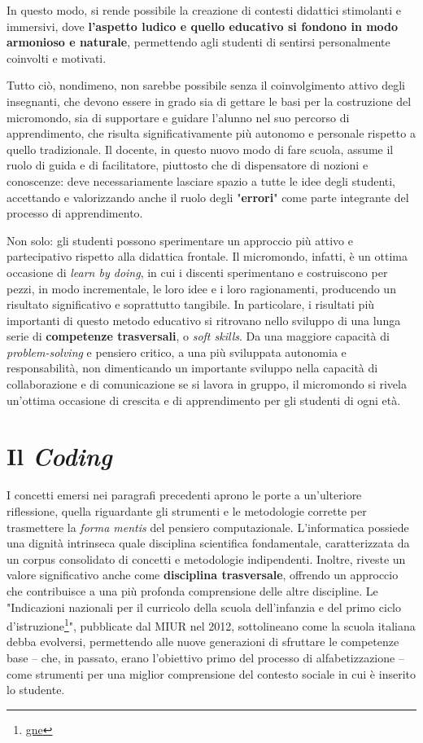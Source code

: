 In questo modo, si rende possibile la creazione di contesti didattici stimolanti e immersivi, dove \textbf{l'aspetto ludico e quello educativo si fondono in modo armonioso e naturale}, permettendo agli studenti di
sentirsi personalmente coinvolti e motivati.

Tutto ciò, nondimeno, non sarebbe possibile senza il coinvolgimento attivo degli insegnanti, che devono essere in grado sia di gettare le basi per la costruzione del micromondo, sia di 
supportare e guidare l'alunno nel suo percorso di apprendimento, che risulta significativamente più autonomo e personale rispetto a quello tradizionale. Il docente, in questo nuovo modo di fare scuola, 
assume il ruolo di guida e di facilitatore, piuttosto che di dispensatore di nozioni e conoscenze: deve necessariamente lasciare spazio a tutte le idee degli studenti, accettando e valorizzando anche 
il ruolo degli "\textbf{errori}" come parte integrante del processo di apprendimento. 

Non solo: gli studenti possono sperimentare un approccio più attivo e partecipativo rispetto alla didattica frontale.
Il micromondo, infatti, è un ottima occasione di \textit{learn by doing}, in cui i discenti sperimentano e costruiscono per pezzi, in modo
incrementale, le loro idee e i loro ragionamenti, producendo un risultato significativo e soprattutto tangibile. 
In particolare, i risultati più importanti di questo metodo educativo si ritrovano nello sviluppo di una lunga serie di \textbf{competenze trasversali}, o \textit{soft skills}. Da una maggiore capacità di   \textit{problem-solving} e
pensiero critico, a una più sviluppata autonomia e responsabilità, non dimenticando un importante sviluppo nella capacità di collaborazione e di comunicazione se si lavora in gruppo, il micromondo si rivela
un'ottima occasione di crescita e di apprendimento per gli studenti di ogni età.

\section{Il \textit{Coding}}
I concetti emersi nei paragrafi precedenti aprono le porte a un'ulteriore riflessione, quella riguardante gli strumenti e le metodologie corrette per
trasmettere la \textit{forma mentis} del pensiero computazionale.  
L'informatica possiede una dignità intrinseca quale disciplina scientifica fondamentale, caratterizzata da un corpus consolidato di concetti e metodologie indipendenti. 
Inoltre, riveste un valore significativo anche come \textbf{disciplina trasversale}, offrendo un approccio che contribuisce a una più profonda comprensione delle altre discipline.
Le "Indicazioni nazionali per il curricolo della scuola dell'infanzia e del primo ciclo d'istruzione\footnote[1]{\url{gne}}", pubblicate dal MIUR nel 2012, 
sottolineano come la scuola italiana debba evolversi, permettendo alle nuove generazioni di sfruttare le competenze base – che, in passato, erano l'obiettivo primo del processo di alfabetizzazione – 
come strumenti per una miglior comprensione del contesto sociale in cui è inserito lo studente.  

